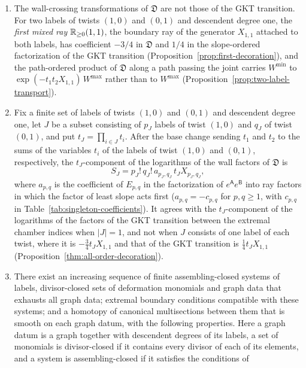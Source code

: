 \begin{maintheorem}
\label{thm:intro-comparison}
\begin{enumerate}
\item The wall-crossing transformations of $\mathfrak D$ are not those of
the GKT transition.  For two labels
of twists $(1,0)$ and $(0,1)$ and descendent degree one, the \emph{first mixed
ray} $\mathbb R_{\geq0}(1,1)$, the boundary ray of the generator $X_{1,1}$ attached
to both labels, has coefficient $-3/4$ in $\mathfrak D$
and $1/4$ in the slope-ordered factorization of the GKT transition
(Proposition~\ref{prop:first-decoration}), and the path-ordered product of
$\mathfrak D$ along a path passing the joint carries $W^{\min}$ to
$\exp(-t_1t_2X_{1,1})\,W^{\max}$ rather than to $W^{\max}$
(Proposition~\ref{prop:two-label-transport}).
\item Fix a finite set of labels of twists $(1,0)$ and $(0,1)$ and
descendent degree one, let $J$ be a subset consisting of $p_J$ labels of
twist $(1,0)$ and $q_J$ of twist $(0,1)$, and put
$t_J=\prod_{i\in J}t_i$.  After the base change sending $t_1$
and $t_2$ to the sums of the variables $t_i$ of the labels of twist $(1,0)$
and $(0,1)$, respectively, the $t_J$-component of the logarithms of the wall factors of $\mathfrak D$ is
\[
 S_J=p_J!\,q_J!\,a_{p_J,q_J}\,t_JX_{p_J,q_J},
\]
where $a_{p,q}$ is the coefficient of $E_{p,q}$ in the factorization of
$e^{\mathsf A}e^{\mathsf B}$ into ray factors in which the factor of least
slope acts first ($a_{p,q}=-c_{p,q}$ for $p,q\geq1$, with
$c_{p,q}$ in Table~\ref{tab:singleton-coefficients}).  It agrees with the
$t_J$-component of the logarithms of the factors of the GKT transition
between the extremal chamber indices when $|J|=1$, and not when $J$
consists of one label of each twist, where it is $-\frac34t_JX_{1,1}$ and
that of the GKT transition is $\frac14t_JX_{1,1}$
(Proposition~\ref{thm:all-order-decoration}).
\item There exist an increasing sequence of finite assembling-closed systems
of labels, divisor-closed sets of deformation monomials and graph data that
exhausts all graph data;
extremal boundary conditions compatible with these systems; and a homotopy
of canonical multisections between them that is smooth on each graph datum,
with the following properties.  Here a graph datum is a graph together with
descendent degrees of its labels, a set of monomials is divisor-closed if it
contains every divisor of each of its elements, and a system is
assembling-closed if it satisfies the conditions of

\end{enumerate}
\end{maintheorem}
